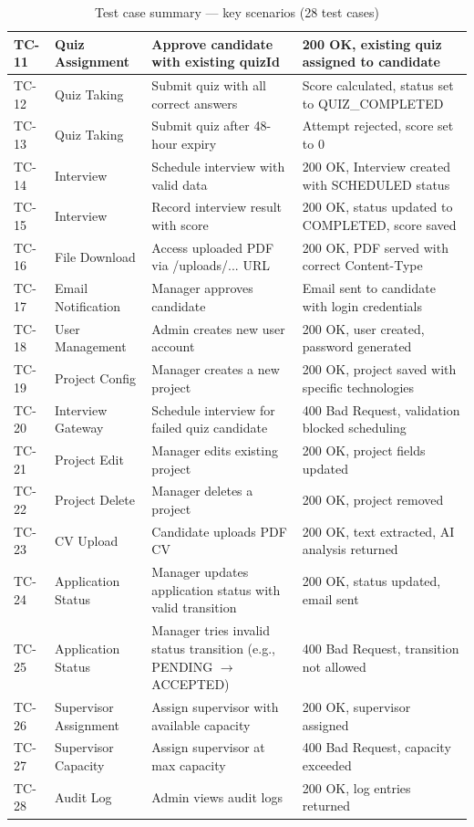 \begin{table}[H]
\begin{tabular}{|p{1.5cm}|p{3.5cm}|p{3.5cm}|p{5cm}|}
\hline
TC-11 & Quiz Assignment & Approve candidate with existing quizId & 200 OK, existing quiz assigned to candidate \\
\hline
TC-12 & Quiz Taking & Submit quiz with all correct answers & Score calculated, status set to QUIZ\_COMPLETED \\
\hline
TC-13 & Quiz Taking & Submit quiz after 48-hour expiry & Attempt rejected, score set to 0 \\
\hline
TC-14 & Interview & Schedule interview with valid data & 200 OK, Interview created with SCHEDULED status \\
\hline
TC-15 & Interview & Record interview result with score & 200 OK, status updated to COMPLETED, score saved \\
\hline
TC-16 & File Download & Access uploaded PDF via /uploads/... URL & 200 OK, PDF served with correct Content-Type \\
\hline
TC-17 & Email Notification & Manager approves candidate & Email sent to candidate with login credentials \\
\hline
TC-18 & User Management & Admin creates new user account & 200 OK, user created, password generated \\
\hline
TC-19 & Project Config & Manager creates a new project & 200 OK, project saved with specific technologies \\
\hline
TC-20 & Interview Gateway & Schedule interview for failed quiz candidate & 400 Bad Request, validation blocked scheduling \\
\hline
TC-21 & Project Edit & Manager edits existing project & 200 OK, project fields updated \\
\hline
TC-22 & Project Delete & Manager deletes a project & 200 OK, project removed \\
\hline
TC-23 & CV Upload & Candidate uploads PDF CV & 200 OK, text extracted, AI analysis returned \\
\hline
TC-24 & Application Status & Manager updates application status with valid transition & 200 OK, status updated, email sent \\
\hline
TC-25 & Application Status & Manager tries invalid status transition (e.g., PENDING $\rightarrow$ ACCEPTED) & 400 Bad Request, transition not allowed \\
\hline
TC-26 & Supervisor Assignment & Assign supervisor with available capacity & 200 OK, supervisor assigned \\
\hline
TC-27 & Supervisor Capacity & Assign supervisor at max capacity & 400 Bad Request, capacity exceeded \\
\hline
TC-28 & Audit Log & Admin views audit logs & 200 OK, log entries returned \\
\hline
\end{tabular}
\caption{Test case summary — key scenarios (28 test cases)}
\end{table}

